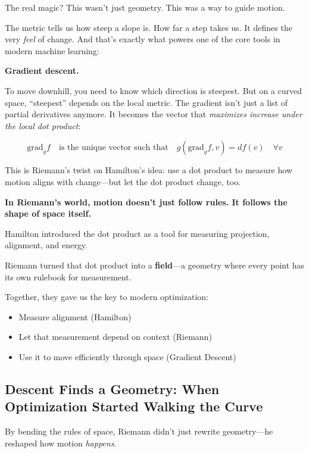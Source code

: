 The real magic? This wasn’t just geometry. This was a way to guide motion.

The metric tells us how steep a slope is. How far a step takes us. It defines the very \emph{feel} of change. And that’s exactly what powers one of the core tools in modern machine learning:

\textbf{Gradient descent.}

To move downhill, you need to know which direction is steepest. But on a curved space, “steepest” depends on the local metric. The gradient isn’t just a list of partial derivatives anymore. It becomes the vector that \emph{maximizes increase under the local dot product}:

\[
\text{grad}_g f \quad \text{is the unique vector such that} \quad g(\text{grad}_g f, v) = df(v) \quad \forall v
\]

This is Riemann’s twist on Hamilton’s idea: use a dot product to measure how motion aligns with change—but let the dot product change, too.

\textbf{In Riemann’s world, motion doesn’t just follow rules. It follows the shape of space itself.}


\begin{tcolorbox}[colback=blue!5!white, colframe=blue!50!black,
title={Sidebar: Hamilton’s Dot Product Grows Up}]
Hamilton introduced the dot product as a tool for measuring projection, alignment, and energy.

Riemann turned that dot product into a \textbf{field}—a geometry where every point has its own rulebook for measurement.

Together, they gave us the key to modern optimization:
\begin{itemize}
  \item Measure alignment (Hamilton)
  \item Let that measurement depend on context (Riemann)
  \item Use it to move efficiently through space (Gradient Descent)
\end{itemize}
\end{tcolorbox}

\subsection{Descent Finds a Geometry: When Optimization Started Walking the Curve}

By bending the rules of space, Riemann didn’t just rewrite geometry—he reshaped how motion \textit{happens}.

